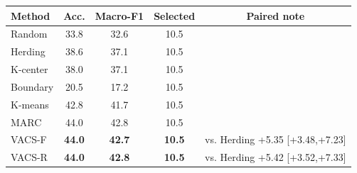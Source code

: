 \begin{tabular}{lcccc}
\toprule
Method & Acc. & Macro-F1 & Selected & Paired note \\
\midrule
Random & 33.8 & 32.6 & 10.5 &  \\
Herding & 38.6 & 37.1 & 10.5 &  \\
K-center & 38.0 & 37.1 & 10.5 &  \\
Boundary & 20.5 & 17.2 & 10.5 &  \\
K-means & 42.8 & 41.7 & 10.5 &  \\
MARC & 44.0 & 42.8 & 10.5 &  \\
VACS-F & \textbf{44.0} & \textbf{42.7} & \textbf{10.5} & vs. Herding +5.35 [+3.48,+7.23] \\
VACS-R & \textbf{44.0} & \textbf{42.8} & \textbf{10.5} & vs. Herding +5.42 [+3.52,+7.33] \\
\bottomrule
\end{tabular}
